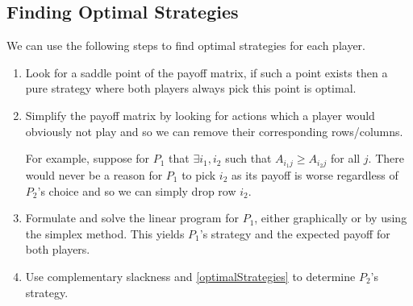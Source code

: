 \documentclass[../main.tex]{subfiles}
\begin{document}
\subsection{Finding Optimal Strategies}
We can use the following steps to find optimal strategies for each player.
\begin{enumerate}
  \item Look for a saddle point of the payoff matrix, if such a point exists then a pure strategy where both players always pick this point is optimal.
  \item Simplify the payoff matrix by looking for actions which a player would obviously not play and so we can remove their corresponding rows/columns.

    For example, suppose for $P_1$ that $\exists i_1, i_2$ such that $A_{i_1 j} \geq A_{i_2 j}$ for all $j$.
    There would never be a reason for $P_1$ to pick $i_2$ as its payoff is worse regardless of $P_2$'s choice and so we can simply drop row $i_2$.
  \item Formulate and solve the linear program for $P_1$, either graphically or by using the simplex method.
    This yields $P_1$'s strategy and the expected payoff for both players.
  \item Use complementary slackness and \cref{optimalStrategies} to determine $P_2$'s strategy.
\end{enumerate}
\end{document}
